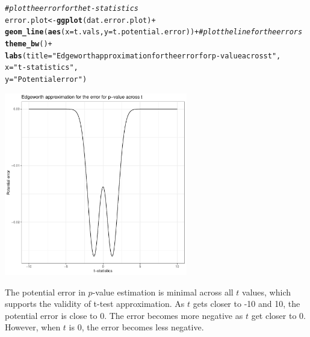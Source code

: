 \documentclass{article}\usepackage[]{graphicx}\usepackage[]{xcolor}
\makeatletter
\newcommand{\hlsng}[1]{\textcolor[rgb]{0.192,0.494,0.8}{#1}}%
\newcommand{\hlcom}[1]{\textcolor[rgb]{0.678,0.584,0.686}{\textit{#1}}}%
\newcommand{\hlopt}[1]{\textcolor[rgb]{0,0,0}{#1}}%
\newcommand{\hldef}[1]{\textcolor[rgb]{0.345,0.345,0.345}{#1}}%
\newcommand{\hlkwb}[1]{\textcolor[rgb]{0.69,0.353,0.396}{#1}}%
\newcommand{\hlkwc}[1]{\textcolor[rgb]{0.333,0.667,0.333}{#1}}%
\newcommand{\hlkwd}[1]{\textcolor[rgb]{0.737,0.353,0.396}{\textbf{#1}}}%
\newenvironment{kframe}{%
 \def\at@end@of@kframe{}%
 \ifinner\ifhmode%
  \def\at@end@of@kframe{\end{minipage}}%
  \begin{minipage}{\columnwidth}%
 \fi\fi%
 \def\FrameCommand##1{\hskip\@totalleftmargin \hskip-\fboxsep
 \colorbox{shadecolor}{##1}\hskip-\fboxsep
     \hskip-\linewidth \hskip-\@totalleftmargin \hskip\columnwidth}%
 \MakeFramed {\advance\hsize-\width
   \@totalleftmargin\z@ \linewidth\hsize
   \@setminipage}}%
 {\par\unskip\endMakeFramed%
 \at@end@of@kframe}
\newenvironment{knitrout}{}{} %
\makeatother
\begin{document}
\begin{enumerate}
\begin{enumerate}
\begin{knitrout}
\begin{kframe}
\begin{alltt}
\hlcom{#plot the error for the t-statistics }
\hldef{error.plot} \hlkwb{<-} \hlkwd{ggplot}\hldef{(dat.error.plot)}\hlopt{+}
\hlkwd{geom_line}\hldef{(}\hlkwd{aes}\hldef{(}\hlkwc{x}\hldef{= t.vals,} \hlkwc{y} \hldef{= t.potential.error))}\hlopt{+} \hlcom{#plot the line for the errors}
\hlkwd{theme_bw}\hldef{()}\hlopt{+}
\hlkwd{labs}\hldef{(}\hlkwc{title} \hldef{=} \hlsng{"Edgeworth approximation for the error for p-value across t"}\hldef{,}
     \hlkwc{x} \hldef{=} \hlsng{"t-statistics"}\hldef{,}
     \hlkwc{y} \hldef{=} \hlsng{"Potential error"}\hldef{)}
\end{alltt}
\end{kframe}
\end{knitrout}
\begin{knitrout}\scriptsize
{}\color{fgcolor}
\includegraphics[width=0.6\textwidth]{figure/unnamed-chunk-4-1} 
\end{knitrout}


The potential error in $p$-value estimation is minimal across all $t$ values, which supports the validity of t-test approximation. As $t$ gets closer to -10 and 10, the potential error is close to 0. The error becomes more negative as $t$ get closer to 0. However, when $t$ is 0, the error becomes less negative.


\end{enumerate}
\end{enumerate}
\end{document}
